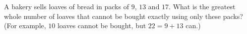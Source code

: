 A bakery sells loaves of bread in packs of $9$, $13$ and $17$. What is the greatest whole number of loaves that cannot be bought exactly using only these packs? (For example, $10$ loaves cannot be bought, but $22=9+13$ can.)
